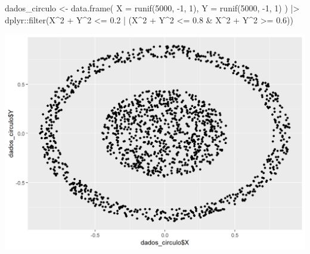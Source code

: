 \documentclass[
  letterpaper,
  DIV=11,
  numbers=noendperiod]{scrreprt}
\newenvironment{Shaded}{\begin{snugshade}}{\end{snugshade}}
\newcommand{\AttributeTok}[1]{\textcolor[rgb]{0.40,0.45,0.13}{#1}}
\newcommand{\DecValTok}[1]{\textcolor[rgb]{0.68,0.00,0.00}{#1}}
\newcommand{\FloatTok}[1]{\textcolor[rgb]{0.68,0.00,0.00}{#1}}
\newcommand{\FunctionTok}[1]{\textcolor[rgb]{0.28,0.35,0.67}{#1}}
\newcommand{\NormalTok}[1]{\textcolor[rgb]{0.00,0.23,0.31}{#1}}
\newcommand{\OtherTok}[1]{\textcolor[rgb]{0.00,0.23,0.31}{#1}}
\newcommand{\SpecialCharTok}[1]{\textcolor[rgb]{0.37,0.37,0.37}{#1}}
\begin{document}
\begin{Shaded}
\begin{Highlighting}[]
\NormalTok{dados\_circulo }\OtherTok{\textless{}{-}} \FunctionTok{data.frame}\NormalTok{(}
 \AttributeTok{X =} \FunctionTok{runif}\NormalTok{(}\DecValTok{5000}\NormalTok{, }\SpecialCharTok{{-}}\DecValTok{1}\NormalTok{, }\DecValTok{1}\NormalTok{),}
  \AttributeTok{Y =} \FunctionTok{runif}\NormalTok{(}\DecValTok{5000}\NormalTok{, }\SpecialCharTok{{-}}\DecValTok{1}\NormalTok{, }\DecValTok{1}\NormalTok{)}
\NormalTok{) }\SpecialCharTok{|\textgreater{}}
\NormalTok{  dplyr}\SpecialCharTok{::}\FunctionTok{filter}\NormalTok{(X}\SpecialCharTok{\^{}}\DecValTok{2} \SpecialCharTok{+}\NormalTok{ Y}\SpecialCharTok{\^{}}\DecValTok{2} \SpecialCharTok{\textless{}=} \FloatTok{0.2} \SpecialCharTok{|}\NormalTok{ (X}\SpecialCharTok{\^{}}\DecValTok{2} \SpecialCharTok{+}\NormalTok{ Y}\SpecialCharTok{\^{}}\DecValTok{2} \SpecialCharTok{\textless{}=} \FloatTok{0.8} \SpecialCharTok{\&}\NormalTok{ X}\SpecialCharTok{\^{}}\DecValTok{2} \SpecialCharTok{+}\NormalTok{ Y}\SpecialCharTok{\^{}}\DecValTok{2} \SpecialCharTok{\textgreater{}=} \FloatTok{0.6}\NormalTok{))}
\end{Highlighting}
\end{Shaded}

\begin{Shaded}
\end{Shaded}

\includegraphics{./figuras_naosupervisionado/unnamed-chunk-18-1.png}
\end{document}
